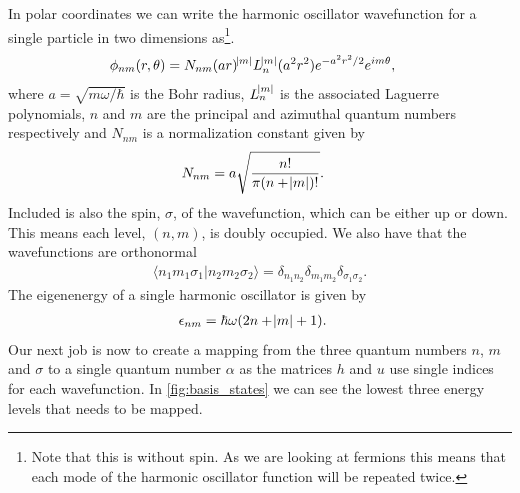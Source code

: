 \documentclass[
    a4paper, aps, twocolumn, floatfix, superscriptaddress,
    nofootinbib]{revtex4-1}
\newcommand{\1}{\mathds{1}}
\newcommand{\braket}[2]{\langle #1 \vert #2 \rangle}
\begin{document}
            In polar coordinates we can write the harmonic oscillator
            wavefunction for a single particle in two dimensions
            as\footnote{Note that this is without spin. As we are looking at
            fermions this means that each mode of the harmonic oscillator
            function will be repeated twice.}.
            \begin{align}
                \phi_{nm}(r, \theta)
                &=
                N_{nm}
                (ar)^{\abs{m}}L_n^{\abs{m}}(a^2 r^2)e^{-a^2 r^2/2}
                e^{im\theta},
            \end{align}
            where $a = \sqrt{m\omega/\hbar}$ is the Bohr radius, $L_n^{\abs{m}}$
            is the associated Laguerre polynomials, $n$ and $m$ are the
            principal and azimuthal quantum numbers respectively and $N_{nm}$ is
            a normalization constant given by
            \begin{align}
                N_{nm}
                &= a\sqrt{\frac{n!}{\pi(n + \abs{m})!}}.
            \end{align}
            Included is also the spin, $\sigma$, of the wavefunction, which can
            be either up or down. This means each level, $(n, m)$, is doubly
            occupied. We also have that the wavefunctions are orthonormal
            \begin{align}
                \braket{n_1m_1\sigma_1}{n_2m_2\sigma_2}
                = \delta_{n_1n_2}\delta_{m_1m_2}\delta_{\sigma_1\sigma_2}.
            \end{align}
            The eigenenergy of a single harmonic oscillator is given by
            \begin{align}
                \epsilon_{nm} &= \hbar\omega(2n + \abs{m} + 1).
            \end{align}
            Our next job is now to create a mapping from the three quantum
            numbers $n$, $m$ and $\sigma$ to a single quantum number $\alpha$ as
            the matrices $h$ and $u$ use single indices for each wavefunction.
            In \autoref{fig:basis_states} we can see the lowest three energy
            levels that needs to be mapped.
\end{document}
